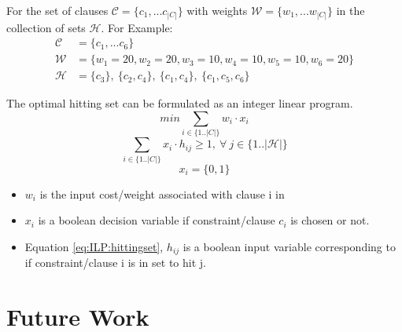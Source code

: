 \documentclass{article}
\newcommand\m[1]{\mathcal{#1}}
\begin{document}
\newpage
For the set of clauses $ \m{C} = \{c_1, ... c_{|C|}\}$ with weights $\m{W} = \{w_1, ... w_{|C|}\}$ in the collection of sets $\m{H}$. For Example:
\begin{equation} \label{mip:example}
  \begin{split}
    \m{C} &= \{c_1, ... c_6 \}  \\
    \m{W} &= \{w_1 = 20, w_2 = 20,  w_3 = 10,  w_4 = 10,  w_5 = 10,  w_6 = 20\} \\
    \m{H} &= \{c_3 \},\ \{c_2, c_4\},\ \{c_1, c_4\},\ \{c_1, c_5, c_6\} 
  \end{split}
  \end{equation}


The optimal hitting set can be formulated as an integer linear program.
\begin{equation} \label{eq:ILP:objective}
  min \sum_{ i \in \{1..|C|\}} w_i \cdot x_i
\end{equation}
\begin{equation} \label{eq:ILP:hittingset}
  \sum_{i \in \{1..|C|\}} x_i \cdot h_{ij} \geq 1, \  \forall \ j \in \{1..|\m{H}|\}
\end{equation}
\begin{equation} \label{eq:ILP:bool:xi}
  x_i = \{0,1\}
\end{equation}
\begin{itemize}
  \item $w_i$ is the input cost/weight associated with clause i in
  \item $x_i$ is a boolean decision variable if constraint/clause $c_i$ is chosen or not.
  \item Equation \ref{eq:ILP:hittingset}, $h_{ij}$ is a boolean input variable corresponding to if constraint/clause i is in set to hit j.
\end{itemize}

\newpage
\section{Future Work}
\end{document}
